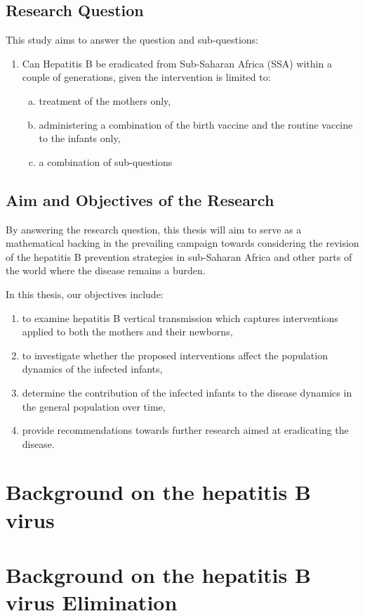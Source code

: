 \subsection{Research Question}
\label{section: research questions}
This study aims to answer the question and sub-questions: 
\begin{enumerate}[1.]
	\item Can Hepatitis B be eradicated from Sub-Saharan Africa (SSA) within a couple of generations, given the intervention is limited to: 
	\begin{enumerate} [(a)]
		\item treatment of the mothers only,  \label{sub question 1}
		\item administering a combination of the birth vaccine and the routine vaccine to the infants only, \label{sub question 2}
		\item a combination of sub-questions \label{sub question 3}
	\end{enumerate}
\end{enumerate}

\subsection{Aim and Objectives of the Research}
By answering the research question, this thesis will aim to serve as a mathematical backing in the prevailing campaign towards considering the revision of the hepatitis B prevention strategies in sub-Saharan Africa and other parts of the world where the disease remains a burden.  

In this thesis, our objectives include:
\begin{enumerate}
	\item to examine hepatitis B vertical transmission which captures interventions applied to both the mothers and their newborns,
	\item to investigate whether the proposed interventions affect the population dynamics of the infected infants,
	\item determine the contribution of the infected infants to the disease dynamics in the general population over time,
	\item provide recommendations towards further research aimed at eradicating the disease.
	
\end{enumerate}

\section{Background on the hepatitis B virus} 
\section{Background on the hepatitis B virus Elimination} 
